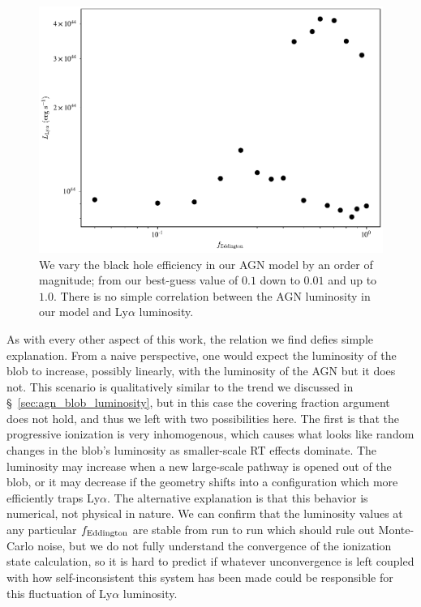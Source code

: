 \begin{figure}
    \centering
    \includegraphics[width=\textwidth,keepaspectratio]{figures/eddington_grid.pdf}
    \caption{
        We vary the black hole efficiency in our AGN model by an order of magnitude; from our best-guess value of $0.1$ down to $0.01$ and up to $1.0$.
        There is no simple correlation between the AGN luminosity in our model and Ly$\alpha$ luminosity.
    }
    \label{fig:eddington_grid}
\end{figure}

As with every other aspect of this work, the relation we find defies simple explanation.
From a naive perspective, one would expect the luminosity of the blob to increase, possibly linearly, with the luminosity of the AGN but it does not.
This scenario is qualitatively similar to the trend we discussed in \S~\ref{sec:agn_blob_luminosity}, but in this case the covering fraction argument does not hold, and thus we left with two possibilities here.
The first is that the progressive ionization is very inhomogenous, which causes what looks like random changes in the blob's luminosity as smaller-scale RT effects dominate.
The luminosity may increase when a new large-scale pathway is opened out of the blob, or it may decrease if the geometry shifts into a configuration which more efficiently traps Ly$\alpha$.
The alternative explanation is that this behavior is numerical, not physical in nature.
We can confirm that the luminosity values at any particular $f_{\rm{Eddington}}$ are stable from run to run which should rule out Monte-Carlo noise, but we do not fully understand the convergence of the ionization state calculation, so it is hard to predict if whatever unconvergence is left coupled with how self-inconsistent this system has been made could be responsible for this fluctuation of Ly$\alpha$ luminosity.

